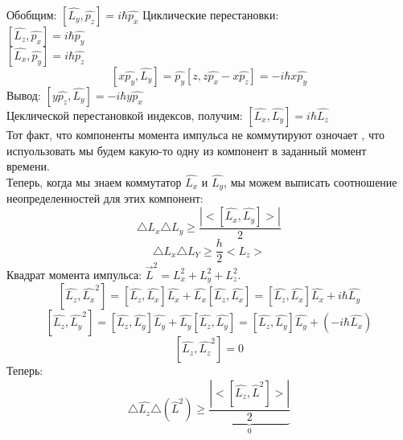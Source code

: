 	 Обобщим: $[\widehat{L_y},\widehat{p_z}] = i\hbar\widehat{p_x}$
	 Циклические перестановки:\\
	 $[\widehat{L_z},\widehat{p_x}] = i\hbar \widehat{p_y}$\\
	 $[\widehat{L_x},\widehat{p_y}] = i\hbar\widehat{p_z}$\\
	 $$[x\widehat{p_y},\widehat{L_y}] = \widehat{p_y}[z,z\widehat{p_x} - x\widehat{p_z}] = -i\hbar x\widehat{p_y}$$
	 Вывод: $[y\widehat{p_z},\widehat{L_y}] = -i\hbar y\widehat{p_x}$\\
	 Цеклической перестановкой индексов, получим: $[\widehat{L_x},\widehat{L_y}] = i\hbar \widehat{L_z}$\\
	 Тот факт, что компоненты момента импульса не коммутируют озночает , что испуользовать мы будем какую-то одну из компонент в заданный момент времени.\\
	 Теперь, когда мы знаем коммутатор $\widehat{L_x}$ и $\widehat{L_y}$, мы можем выписать соотношение неопределенностей для этих компонент:
	 $$\triangle L_x \triangle L_y \geq \frac{|<[\widehat{L_x},\widehat{L_y}]>|}{2}$$
	 $$\triangle L_x \triangle L_Y \geq \frac{h}{2} <L_z>$$
	 Квадрат момента импульса: $\vec{L}^2 = L_x ^2 + L_y ^2 + L_z ^2$.\\
	 $$ [\widehat{L_z},\widehat{L_x}^2] = [\widehat{L_z},\widehat{L_x}]\widehat{L_x}+\widehat{L_x}[\widehat{L_z},\widehat{L_x}] = [\widehat{L_z},\widehat{L_x}]\widehat{L_x}+ i\hbar \widehat{L_y}$$
	 $$ [\widehat{L_z},\widehat{L_y}^2] = [\widehat{L_z},\widehat{L_y}]\widehat{L_y} + \widehat{L_y}[\widehat{L_z},\widehat{L_y}] = [\widehat{L_z},\widehat{L_y}]\widehat{L_y} + (-i \hbar \widehat{L_x})$$
	 $$[\widehat{L_z},\widehat{L_z}^2] = 0$$
	 Теперь:
	$$ \triangle \widehat{L_z} \triangle(\widehat{L}^2) \geq \underbrace{ \frac{|<[\widehat{L_z},\widehat{L}^2]>|}{2}}_0$$
